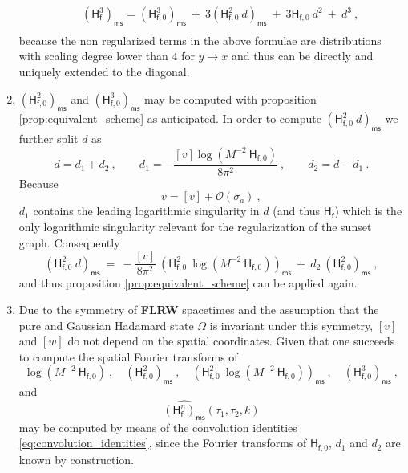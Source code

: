\documentclass[12pt]{book}
\newcommand{\ms}{\mathsf{ms}}
\newcommand{\Ocal}{\mathcal{O}}
\newcommand{\Hsf}{\mathsf{H}}
\newcommand{\fsf}{\mathsf{f}}
\theoremstyle{break}
\begin{document}
\begin{enumerate}
\begin{eqnarray}
&& (\Hsf_\fsf^3)_\ms = (\Hsf_{\fsf,0}^3)_\ms \ + \ 3 \left(\Hsf_{\fsf,0}^2 \ d \right)_\ms \ + \ 3 \Hsf_{\fsf,0} \ d^2 \ + \ d^3 \ , \nonumber \\
\label{eq:fish_sunset_reg}
\end{eqnarray}
%
because the non regularized terms in the above formulae are distributions with scaling degree lower than $4$ for $y \to x$ and thus can be directly and uniquely extended to the diagonal.
%
%
\item $\left(\Hsf_{\fsf,0}^2\right)_\ms$ and  $\left(\Hsf_{\fsf,0}^3\right)_\ms$ may be computed with proposition \ref{prop:equivalent_scheme} as anticipated. In order to compute $\left(\Hsf_{\fsf,0}^2 \ d\right)_\ms$ we further split $d$ as
%
\begin{equation*}%
d = d_1 + d_2 \ , \qquad d_1 = - \frac{[v] \log\left(M^{-2} \ \Hsf_{\fsf,0}\right)}{8\pi^2} \ ,\qquad d_2 = d - d_1 \ .
\label{eq:d_split}
\end{equation*}
%
Because 
%
\begin{equation*}
v = [v] + \Ocal(\sigma_a) \ , 
\end{equation*}
%
$d_1$ contains the leading logarithmic singularity in $d$ (and thus $\Hsf_\fsf$) which is the only logarithmic singularity relevant for the regularization of the sunset graph. Consequently
%
\begin{equation}
\left(\Hsf_{\fsf,0}^2 \ d\right)_\ms \ = \ - \frac{[v]}{8\pi^2} \ \left(\Hsf_{\fsf,0}^2 \ \log\left(M^{-2} \ \Hsf_{\fsf,0} \right) \right)_\ms \ + \ d_2 \ \left(\Hsf_{\fsf,0}^2 \right)_\ms \ ,
\label{eq:fish_sunset_reg_2}
\end{equation}
%
and thus proposition \ref{prop:equivalent_scheme} can be applied again.
%
%
\item Due to the symmetry of \textbf{FLRW} spacetimes and the assumption that the pure and Gaussian Hadamard state $\Omega$ is invariant under this symmetry, $[v]$ and $[w]$ do not depend on the spatial coordinates. Given that one succeeds to compute the spatial Fourier transforms of 
%
\begin{equation*}
\log \left(M^{-2} \ \Hsf_{\fsf,0}\right) \ , \quad
\left(\Hsf_{\fsf,0}^2\right)_\ms \ , \quad
\left(\Hsf_{\fsf,0}^2 \ \log\left(M^{-2} \ \Hsf_{\fsf,0}\right)\right)_\ms \ , \quad  \left(\Hsf_{\fsf,0}^3\right)_\ms \ , 
\end{equation*}
%
and
%
\begin{equation*}
\widehat{(\Hsf_\fsf^n)_\ms}(\tau_1,\tau_2,k)
\end{equation*}
%
may be computed by means of the convolution identities \eqref{eq:convolution_identities}, since the Fourier transforms of $\Hsf_{\fsf,0}$, $d_1$ and $d_2$ are known by construction.
%
%
\end{enumerate}
\end{document}
